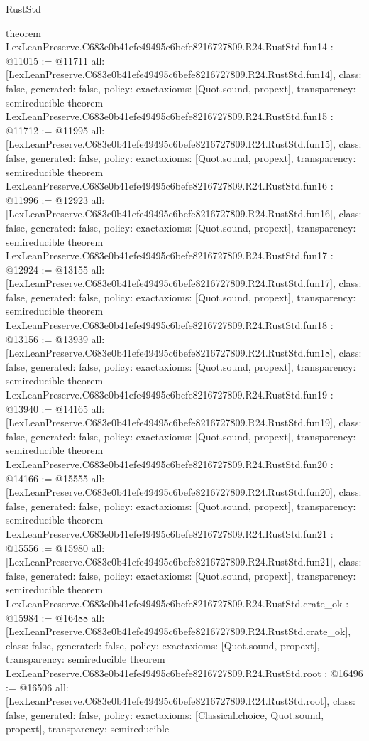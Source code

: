 \begin{lexlean}{RustStd}
\begin{coremodule}
{}
theorem LexLeanPreserve.C683e0b41efe49495c6befe8216727809.R24.RustStd.fun14 : @11015 := @11711 {
  all: [LexLeanPreserve.C683e0b41efe49495c6befe8216727809.R24.RustStd.fun14],
  class: false,
  generated: false,
  policy: exact{axioms: [Quot.sound, propext]},
  transparency: semireducible
}
theorem LexLeanPreserve.C683e0b41efe49495c6befe8216727809.R24.RustStd.fun15 : @11712 := @11995 {
  all: [LexLeanPreserve.C683e0b41efe49495c6befe8216727809.R24.RustStd.fun15],
  class: false,
  generated: false,
  policy: exact{axioms: [Quot.sound, propext]},
  transparency: semireducible
}
theorem LexLeanPreserve.C683e0b41efe49495c6befe8216727809.R24.RustStd.fun16 : @11996 := @12923 {
  all: [LexLeanPreserve.C683e0b41efe49495c6befe8216727809.R24.RustStd.fun16],
  class: false,
  generated: false,
  policy: exact{axioms: [Quot.sound, propext]},
  transparency: semireducible
}
theorem LexLeanPreserve.C683e0b41efe49495c6befe8216727809.R24.RustStd.fun17 : @12924 := @13155 {
  all: [LexLeanPreserve.C683e0b41efe49495c6befe8216727809.R24.RustStd.fun17],
  class: false,
  generated: false,
  policy: exact{axioms: [Quot.sound, propext]},
  transparency: semireducible
}
theorem LexLeanPreserve.C683e0b41efe49495c6befe8216727809.R24.RustStd.fun18 : @13156 := @13939 {
  all: [LexLeanPreserve.C683e0b41efe49495c6befe8216727809.R24.RustStd.fun18],
  class: false,
  generated: false,
  policy: exact{axioms: [Quot.sound, propext]},
  transparency: semireducible
}
theorem LexLeanPreserve.C683e0b41efe49495c6befe8216727809.R24.RustStd.fun19 : @13940 := @14165 {
  all: [LexLeanPreserve.C683e0b41efe49495c6befe8216727809.R24.RustStd.fun19],
  class: false,
  generated: false,
  policy: exact{axioms: [Quot.sound, propext]},
  transparency: semireducible
}
theorem LexLeanPreserve.C683e0b41efe49495c6befe8216727809.R24.RustStd.fun20 : @14166 := @15555 {
  all: [LexLeanPreserve.C683e0b41efe49495c6befe8216727809.R24.RustStd.fun20],
  class: false,
  generated: false,
  policy: exact{axioms: [Quot.sound, propext]},
  transparency: semireducible
}
theorem LexLeanPreserve.C683e0b41efe49495c6befe8216727809.R24.RustStd.fun21 : @15556 := @15980 {
  all: [LexLeanPreserve.C683e0b41efe49495c6befe8216727809.R24.RustStd.fun21],
  class: false,
  generated: false,
  policy: exact{axioms: [Quot.sound, propext]},
  transparency: semireducible
}
theorem LexLeanPreserve.C683e0b41efe49495c6befe8216727809.R24.RustStd.crate_ok : @15984 := @16488 {
  all: [LexLeanPreserve.C683e0b41efe49495c6befe8216727809.R24.RustStd.crate_ok],
  class: false,
  generated: false,
  policy: exact{axioms: [Quot.sound, propext]},
  transparency: semireducible
}
theorem LexLeanPreserve.C683e0b41efe49495c6befe8216727809.R24.RustStd.root : @16496 := @16506 {
  all: [LexLeanPreserve.C683e0b41efe49495c6befe8216727809.R24.RustStd.root],
  class: false,
  generated: false,
  policy: exact{axioms: [Classical.choice, Quot.sound, propext]},
  transparency: semireducible
}


\end{coremodule}
\end{lexlean}
